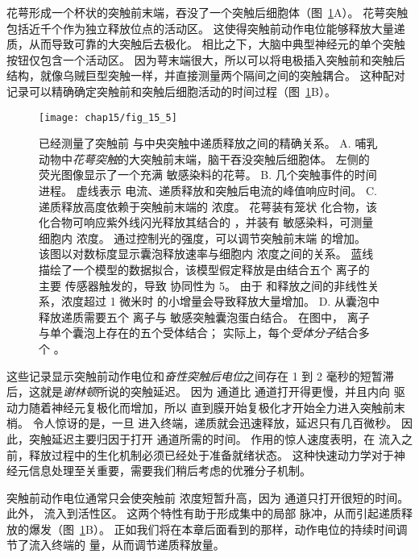 花萼形成一个杯状的突触前末端，吞没了一个突触后细胞体（图~\ref{fig:15_5}A）。
花萼突触包括近千个作为独立释放位点的活动区。
这使得突触前动作电位能够释放大量递质，从而导致可靠的大突触后去极化。
相比之下，大脑中典型神经元的单个突触按钮仅包含一个活动区。
因为萼末端很大，所以可以将电极插入突触前和突触后结构，就像乌贼巨型突触一样，并直接测量两个隔间之间的突触耦合。
这种配对记录可以精确确定突触前和突触后细胞活动的时间过程（图~\ref{fig:15_5}B）。


\begin{figure}[htbp]
	\centering
	\texttt{[image: chap15/fig\_15\_5]}
	\caption{已经测量了突触前  与中央突触中递质释放之间的精确关系\cite{meinrenken2003hodgkin,sun2007dual}。
	A. 哺乳动物中\textit{花萼突触}的大突触前末端，脑干吞没突触后细胞体。
	左侧的荧光图像显示了一个充满  敏感染料的花萼。
	B. 几个突触事件的时间进程。
	虚线表示  电流、递质释放和突触后电流的峰值响应时间。
	C. 递质释放高度依赖于突触前末端的  浓度。
	花萼装有笼状  化合物，该化合物可响应紫外线闪光释放其结合的 ，并装有  敏感染料，可测量细胞内  浓度。
	通过控制光的强度，可以调节突触前末端  的增加。
	该图以对数标度显示囊泡释放速率与细胞内  浓度之间的关系。
	蓝线描绘了一个模型的数据拟合，该模型假定释放是由结合五个  离子的主要  传感器触发的，导致  协同性为 5。
	由于  和释放之间的非线性关系，浓度超过 1 微米时  的小增量会导致释放大量增加。
	D. 从囊泡中释放递质需要五个  离子与  敏感突触囊泡蛋白结合。
	在图中， 离子与单个囊泡上存在的五个受体结合；
	实际上，每个\textit{受体分子}结合多个 。}
	\label{fig:15_5}
\end{figure}


这些记录显示突触前动作电位和\textit{奋性突触后电位}之间存在 1 到 2 毫秒的短暂滞后，这就是\textit{谢林顿}所说的突触延迟。
因为  通道比  通道打开得更慢，并且内向  驱动力随着神经元复极化而增加，所以  直到膜开始复极化才开始全力进入突触前末梢。
令人惊讶的是，一旦  进入终端，递质就会迅速释放，延迟只有几百微秒。
因此，突触延迟主要归因于打开  通道所需的时间。
 作用的惊人速度表明，在  流入之前，释放过程中的生化机制必须已经处于准备就绪状态。 
这种快速动力学对于神经元信息处理至关重要，需要我们稍后考虑的优雅分子机制。


突触前动作电位通常只会使突触前  浓度短暂升高，因为  通道只打开很短的时间。 
此外， 流入到活性区。
这两个特性有助于形成集中的局部  脉冲，从而引起递质释放的爆发（图~\ref{fig:15_5}B）。
正如我们将在本章后面看到的那样，动作电位的持续时间调节了流入终端的  量，从而调节递质释放量。


